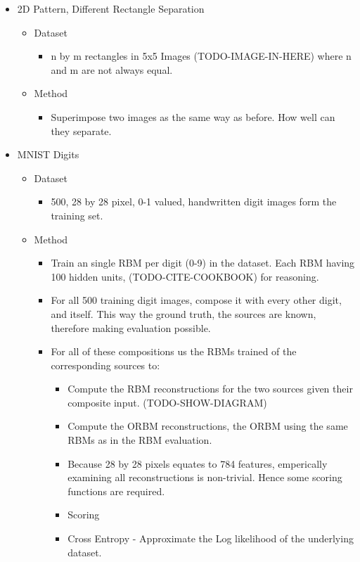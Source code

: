 \begin{itemize}
  \item 2D Pattern, Different Rectangle Separation
  \begin{itemize}
    \item Dataset
    \begin{itemize}
      \item n by m rectangles in 5x5 Images (TODO-IMAGE-IN-HERE) where n and m are not always equal.
    \end{itemize}
    \item Method
    \begin{itemize}
      \item Superimpose two images as the same way as before. How well can they separate.
    \end{itemize}
  \end{itemize}
  \item MNIST Digits
  \begin{itemize}
    \item Dataset
    \begin{itemize}
      \item 500, 28 by 28 pixel, 0-1 valued, handwritten digit images form the training set.
    \end{itemize}
    \item Method
    \begin{itemize}
      \item Train an single RBM per digit (0-9) in the dataset. Each RBM having 100 hidden units, (TODO-CITE-COOKBOOK) for reasoning.
      \item For all 500 training digit images, compose it with every other digit, and itself. This way the ground truth, the sources are known, therefore making evaluation possible.
      \item For all of these compositions us the RBMs trained of the corresponding sources to:
      \begin{itemize}
        \item Compute the RBM reconstructions for the two sources given their composite input. (TODO-SHOW-DIAGRAM)
        \item Compute the ORBM reconstructions, the ORBM using the same RBMs as in the RBM evaluation.
        \item Because 28 by 28 pixels equates to 784 features, emperically examining all reconstructions is non-trivial. Hence some scoring functions are required.
        \item Scoring
        \item Cross Entropy - Approximate the Log likelihood of the underlying dataset.

\end{itemize}
\end{itemize}
\end{itemize}
\end{itemize}
